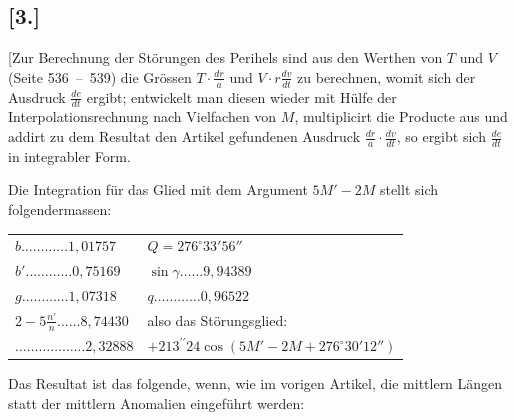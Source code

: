 \documentclass[10pt,a4paper]{article}
\begin{document}
\newpage
\subsection*{[3.]}

[Zur Berechnung der Störungen des Perihels sind aus den Werthen von $T$ und $V$ (Seite 536~--~539) die 
Grössen $T \cdot \frac{dr}{a}$ und $V \cdot r\frac{dv}{dt}$ zu berechnen, womit sich der Ausdruck 
$\frac{de}{dt}$ ergibt; entwickelt man diesen wieder mit Hülfe der Interpolationsrechnung nach Vielfachen 
von $M$, multiplicirt die Producte aus und addirt zu dem Resultat den 
Artikel gefundenen Ausdruck $\frac{dr}{a} \cdot \frac{dv}{dt}$, so ergibt sich $\frac{de}{dt}$ in integrabler Form.

Die Integration für das Glied mit dem Argument $5M' - 2M$ stellt sich folgendermassen:

\begin{center}
\begin{tabular}{ll}
$b \ldots\ldots\ldots\ldots 1,01757$ & $Q = 276^{\circ}33'56''$ \\
$b' \ldots\ldots\ldots\ldots 0,75169$ & $\sin \gamma \ldots\ldots 9,94389$ \\
$g \ldots\ldots\ldots\ldots 1,07318$ & $q \ldots\ldots\ldots\ldots 0,96522$ \\
$2 - 5\frac{n'}{n} \ldots\ldots 8,74430$ & also das Störungsglied: \\
$\ldots\ldots\ldots\ldots\ldots\ldots 2,32888$ & $+ 213^{\prime\prime}24 \cos(5M' - 2M + 276^{\circ}30'12'')$
\end{tabular}
\end{center}

Das Resultat ist das folgende, wenn, wie im vorigen Artikel, die mittlern Längen statt der mittlern 
Anomalien eingeführt werden:
\end{document}
